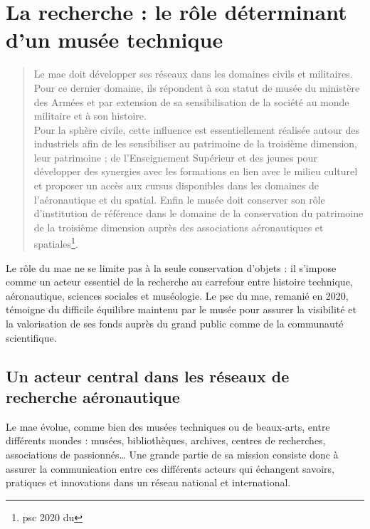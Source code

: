 \section{\label{I-A-2}La recherche : le rôle déterminant d'un musée technique}

\begin{quote}
	\og Le \acf{mae} doit développer ses réseaux \textelp{} dans les domaines civils et militaires. Pour ce dernier domaine, ils répondent à son statut de musée du ministère des Armées et par extension de sa sensibilisation de la société au monde militaire et à son histoire.\\
	Pour la sphère civile, cette influence est essentiellement réalisée autour des industriels afin de les sensibiliser au patrimoine de la troisième dimension, leur patrimoine ; de l’Enseignement Supérieur et des jeunes pour développer des synergies avec les formations en lien avec le milieu culturel et proposer un accès aux cursus disponibles dans les domaines de l’aéronautique et du spatial. Enfin \textelp{} le musée doit conserver son rôle d’institution de référence dans le domaine de la conservation du patrimoine de la troisième dimension auprès des associations aéronautiques et spatiales\footnote{\Ac{psc} 2020 du \mae}.\fg
\end{quote}


Le rôle du \ac{mae} ne se limite pas à la seule conservation d'objets : il s'impose comme un acteur essentiel de la recherche au carrefour entre histoire technique, aéronautique, sciences sociales et muséologie. Le \ac{psc} du \acf{mae}, remanié en 2020, témoigne du difficile équilibre maintenu par le musée pour assurer la visibilité et la valorisation de ses fonds auprès du grand public comme de la communauté scientifique.

\subsection{Un acteur central dans les réseaux de recherche aéronautique}

Le \ac{mae} évolue, comme bien des musées techniques ou de beaux-arts, entre différents mondes : musées, bibliothèques, archives, centres de recherches, associations de passionnés\ldots{} Une grande partie de sa mission consiste donc à assurer la communication entre ces différents acteurs qui échangent savoirs, pratiques et innovations dans un réseau national et international.

